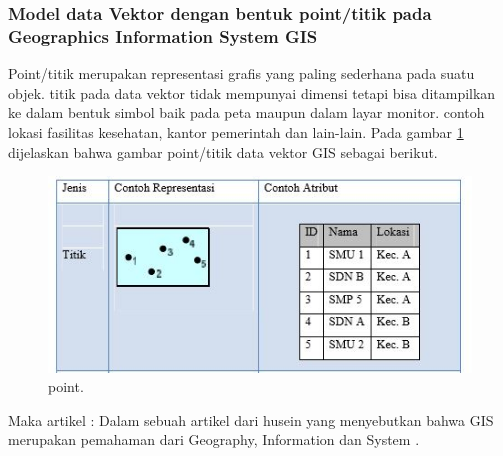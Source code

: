\subsubsection{Model data Vektor dengan bentuk point/titik pada Geographics Information System GIS}
Point/titik merupakan representasi grafis yang paling sederhana pada suatu objek. titik pada data vektor tidak mempunyai dimensi tetapi bisa ditampilkan ke dalam bentuk simbol baik pada peta maupun dalam layar monitor. contoh  lokasi fasilitas kesehatan, kantor pemerintah dan lain-lain.
Pada gambar \ref{point} dijelaskan bahwa gambar point/titik data vektor GIS sebagai berikut.
\begin{figure}[ht]
	\centerline{\includegraphics[width=1\textwidth]{figures/point.JPG}}
	\caption{point.}
	\label{point}
	\end{figure}

Maka artikel :
	Dalam sebuah artikel dari husein yang menyebutkan bahwa  GIS merupakan pemahaman dari
	Geography, Information dan System \cite{widiatmoko2009aplikasi}.

